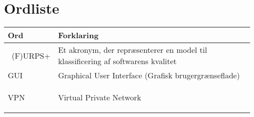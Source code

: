 \chapter{Ordliste}


\begin{longtabu} to 
    Ord &    Forklaring\\
    \toprule \
    (F)URPS+ &    Et akronym, der repræsenterer en model til klassificering af softwarens kvalitet\\
    GUI		&	Graphical User Interface (Grafisk brugergrænseflade)\\
    VPN		&	Virtual Private Network
 
\label{forkort}
\end{longtabu}